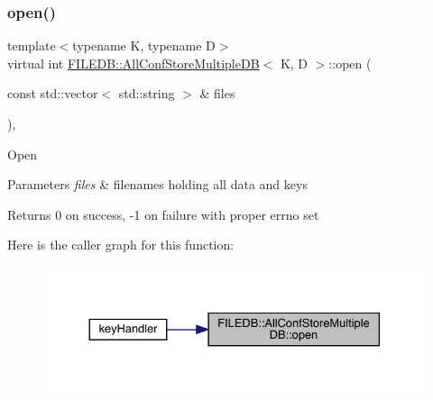 \subsubsection{\texorpdfstring{open()}{open()}\hspace{0.1cm}{\footnotesize\ttfamily [3/3]}}
{\footnotesize\ttfamily template$<$typename K, typename D$>$ \\
virtual int \mbox{\hyperlink{classFILEDB_1_1AllConfStoreMultipleDB}{F\+I\+L\+E\+D\+B\+::\+All\+Conf\+Store\+Multiple\+DB}}$<$ K, D $>$\+::open (\begin{DoxyParamCaption}\item[{const std\+::vector$<$ std\+::string $>$ \&}]{files }\end{DoxyParamCaption})\hspace{0.3cm}{\ttfamily [inline]}, {\ttfamily [virtual]}}

Open 
\begin{DoxyParams}{Parameters}
{\em files} & filenames holding all data and keys\\
\hline
\end{DoxyParams}
\begin{DoxyReturn}{Returns}
0 on success, -\/1 on failure with proper errno set 
\end{DoxyReturn}
Here is the caller graph for this function\+:
\nopagebreak
\begin{figure}[H]
\begin{center}
\leavevmode
\includegraphics[width=330pt]{d5/dbe/classFILEDB_1_1AllConfStoreMultipleDB_aa006283e8d6f0f079ca234c369f53679_icgraph}
\end{center}
\end{figure}
\mbox{\label{classFILEDB_1_1AllConfStoreMultipleDB_a746ef51b2dedf529a8e85528c0d31bfc}} 
